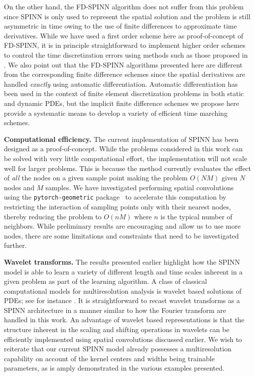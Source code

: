 \documentclass[12pt]{article}
\begin{document}
On the other hand, the FD-SPINN algorithm does not suffer from this problem since SPINN is only used to represent the spatial solution and the problem is still asymmetric in time owing to the use of finite differences to approximate time derivatives. While we have used a first order scheme here as proof-of-concept of FD-SPINN, it is in principle straightforward to implement higher order schemes to control the time discretization errors using methods such as those proposed in \cite{SCL2020pre}. We also point out that the FD-SPINN algorithms presented here are different from the corresponding finite difference schemes since the spatial derivatives are handled \emph{exactly} using automatic differentiation. Automatic differentiation has been used in the context of finite element discretization problems in both static \cite{TRRB2002} and dynamic \cite{RG2014} PDEs, but the implicit finite difference schemes we propose here provide a systematic means to develop a variety of efficient time marching schemes.

\textbf{Computational efficiency.} The current implementation of SPINN has been designed as a proof-of-concept.  While the problems considered in this work can be solved with very little computational effort, the implementation will not scale well for larger problems. This is because the method currently evaluates the effect of \emph{all} the nodes on a given sample point making the problem $O(NM)$ given $N$ nodes and $M$ samples.  We have investigated performing spatial convolutions using the \texttt{pytorch-geometric} package~\cite{pytorch_geometric} to accelerate this computation by restricting the interaction of sampling points only with their nearest nodes, thereby reducing the problem to $O(nM)$ where $n$ is the typical number of neighbors.  While preliminary results are encouraging and allow us to use more nodes, there are some limitations and constraints that need to be investigated further.

\textbf{Wavelet transforms.} The results presented earlier highlight how the SPINN model is able to learn a variety of different length and time scales inherent in a given problem as part of the learning algorithm. A class of classical computational models for multiresolution analysis is wavelet based solutions of PDEs; see for instance \cite{WA94}. It is straightforward to recast wavelet transforms as a SPINN architecture in a manner similar to how the Fourier transform are handled in this work. An advantage of wavelet based representations is that the structure inherent in the scaling and shifting operations in wavelets can be efficiently implemented using spatial convolutions discussed earlier. We wish to reiterate that our current SPINN model already possesses a multiresolution capability on account of the kernel centers and widths being trainable parameters, as is amply demonstrated in the various examples presented.
\end{document}
